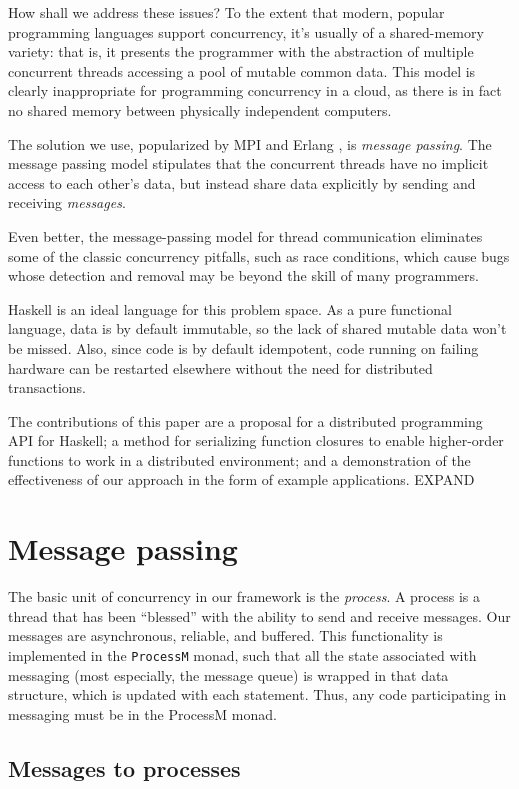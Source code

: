 \documentclass[preprint]{sigplanconf}
\begin{document}
How shall we address these issues? To the extent that modern, popular programming languages support concurrency, it's usually of a shared-memory variety: that is, it presents the programmer with the abstraction of multiple concurrent threads accessing a pool of mutable common data. This model is clearly inappropriate for programming concurrency in a cloud, as there is in fact no shared memory between physically independent computers.

The solution we use, popularized by MPI \cite{mpi99} and Erlang \cite{Erlang93}, is {\em message passing}. The message passing model stipulates that the concurrent threads have no implicit access to each other's data, but instead share data explicitly by sending and receiving {\em messages}. 

Even better, the message-passing model for thread communication eliminates some of the classic concurrency pitfalls, such as race conditions, which cause bugs whose detection and removal may be beyond the skill of many programmers. 

Haskell is an ideal language for this problem space. As a pure functional language, data is by default immutable, so the lack of shared mutable data won't be missed. Also, since code is by default idempotent, code running on failing hardware can be restarted elsewhere without the need for distributed transactions.

The contributions of this paper are a proposal for a distributed programming API for Haskell; a method for serializing function closures to enable higher-order functions to work in a distributed environment; and a demonstration of the effectiveness of our approach in the form of example applications. EXPAND

\section{Message passing}

The basic unit of concurrency in our framework is the {\em process}. A process is a thread that has been ``blessed'' with the ability to send and receive messages. Our messages are asynchronous, reliable, and buffered. This functionality is implemented in the \texttt{ProcessM} monad, such that all the state associated with messaging (most especially, the message queue) is wrapped in that data structure, which is updated with each statement. Thus, any code participating in messaging must be in the ProcessM monad.

\subsection{Messages to processes}
\end{document}
